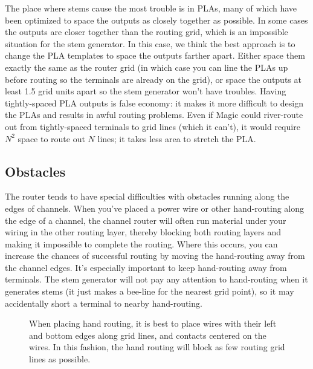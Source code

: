 \documentclass[letterpaper,twoside,12pt]{article}
\begin{document}
The place where stems cause the most trouble is in PLAs, many of
which have been optimized to space the outputs as closely together
as possible.  In some cases the outputs are closer together than
the routing grid, which is an impossible situation for the stem
generator.  In this case, we think the best approach is to change
the PLA templates to space the outputs farther apart.  Either space
them exactly the same as the router grid (in which case you can
line the PLAs up before routing so the terminals are already on
the grid), or space the outputs at least 1.5 grid units apart so the stem
generator won't have troubles.  Having tightly-spaced PLA outputs
is false economy: it makes it more difficult to design the PLAs
and results in awful routing problems.  Even if Magic could
river-route out from tightly-spaced terminals to grid lines (which
it can't), it would require $N^2$ space to route out
$N$ lines;  it takes less area to stretch the PLA.

\subsection{Obstacles}

The router tends to have special difficulties with
obstacles running along the edges of channels.  When you've placed
a power wire or other hand-routing along the edge of a channel,
the channel router will often run material under your wiring in
the other routing layer, thereby blocking both routing layers
and making it impossible to complete the routing.  Where this
occurs, you can increase the chances of successful routing by
moving the hand-routing away from the channel edges.  It's
especially important to keep hand-routing away from terminals.
The stem generator will not pay any attention to hand-routing
when it generates stems (it just makes a bee-line for the nearest
grid point), so it may accidentally short a terminal to nearby
hand-routing.

\begin{figure}[ht]
   \begin{center}
       \caption{When placing hand routing, it is best to place
	wires with their left and bottom edges along grid lines, and
	contacts centered on the wires.  In this fashion, the hand routing
	will block as few routing grid lines as possible.}
   \end{center}
\end{figure}
\end{document}
